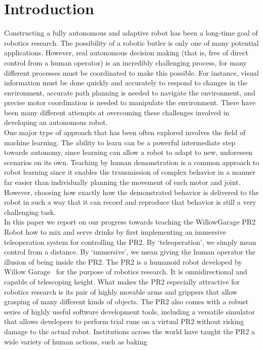 \documentclass{sig-alternate}
\begin{document}
\section{Introduction}
\label{sec:intro}
\indent Constructing a fully autonomous and adaptive robot has been a long-time goal of robotics research.
The possibility of a robotic butler is only one of many potential applications. However, real
autonomous decision making (that is, free of direct control from a human operator) is an incredibly challenging process, for many different processes must 
be coordinated to make this possible. For instance, visual information must be done quickly and accurately to respond to 
changes in the environment, accurate path planning is needed to navigate the environment, and 
precise motor coordination is needed to manipulate the environment. There have been many different 
attempts at overcoming these challenges involved in developing an autonomous robot. \\
\indent One major type of approach 
that has been often explored involves the field of machine learning. The ability to learn can be a powerful intermediate 
step towards autonomy, since learning can allow a robot to adapt to new, unforeseen scenarios on its own. 
Teaching by human demonstration is a common approach to robot learning since it enables the 
transmission of complex behavior in a manner far easier than individually planning the movement of each motor and joint. However, choosing how exactly how the demonstrated behavior is delivered to the 
robot in such a way that it can record and reproduce that behavior is still a very challenging task.\\ 
\indent In this paper we report on our progress towards teaching the WillowGarage PR2 Robot how to mix and
serve drinks by first implementing an immersive teleoperation system for controlling the PR2. By `teleoperation', we simply mean control from
a distance. By `immersive', we mean giving the human operator the illusion of being inside the PR2. The PR2 is a humanoid robot developed by  Willow Garage~\cite{pr2} for the purpose of robotics 
research. It is omnidirectional and capable of telescoping height. What makes the PR2 especially attractive for robotics research is its pair of highly movable arms and grippers that allow grasping of many different kinds of objects. The PR2 also comes with a robust series of highly useful software development tools,
including a versatile simulator that allows developers to perform trial runs on a virtual PR2 without
risking damage to the actual robot. Institutions across the world have taught the PR2 a wide variety of human actions, such as baking 
\end{document}
